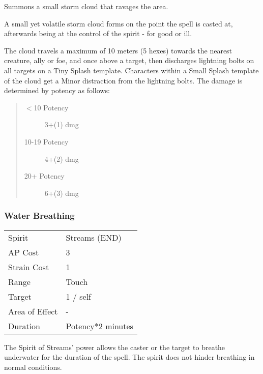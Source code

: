 \documentclass[11pt,a4paper,twocolumn]{book}
\begin{document}
\medskip

Summons a small storm cloud that ravages the area.

A small yet volatile storm cloud forms on the point the spell is casted at, afterwards being at the control of the spirit - for good or ill.

The cloud travels a maximum of 10 meters (5 hexes) towards the nearest creature, ally or foe, and once above a target, then discharges lightning bolts on all targets on a Tiny Splash template. Characters within a Small Splash template of the cloud get a Minor distraction from the lightning bolts. The damage is determined by potency as follows:

\begin{quote}
	\begin{description}
		\item[$<$10 Potency] 	3+(1) dmg
		\item[10-19 Potency] 	4+(2) dmg
		\item[20+ Potency] 		6+(3) dmg
	\end{description}	
\end{quote}


\subsubsection*{Water Breathing}
{
	\begin{tabu} to 70mm{| X[l,4] | X[l,7] |}
		\hline
		Spirit         & Streams (END)            \\
		AP Cost        & 3                        \\
		Strain Cost    & 1                        \\
		Range          & Touch                    \\
		Target         & 1 / self                 \\
		Area of Effect & -                        \\
		Duration       & Potency*2 minutes \\ \hline
	\end{tabu}
	
}
\medskip

The Spirit of Streams' power allows the caster or the target to breathe underwater for the duration of the spell. The spirit does not hinder breathing in normal conditions.
\end{document}
